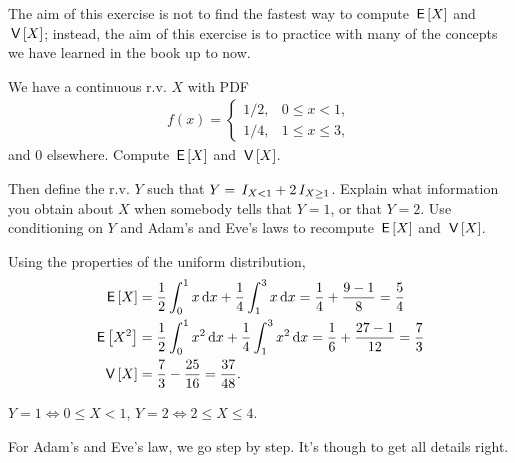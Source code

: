 \begin{exercise}
The aim of this exercise is not to find the fastest way to compute $\,\mathsf{E}\left[X\right]$ and $\,\mathsf{V}\left[X\right]$; instead, the aim of this exercise is to practice with many of the concepts we have learned in the book up to now.


We have a continuous r.v. $X$ with PDF
\begin{align}
  \label{eq:1123}
  f(x) =
  \begin{cases}
    1/2, & 0\leq x < 1, \\
    1/4, & 1\leq x \leq 3,
  \end{cases}
\end{align}
and $0$ elsewhere. Compute $\,\mathsf{E}\left[X\right]$ and $\,\mathsf{V}\left[X\right]$.

Then define the r.v.
$Y$ such that $Y=\,I_{X< 1} + 2\,I_{X\geq 1}$.
Explain what information you obtain about $X$ when somebody tells that $Y=1$, or that $Y=2$.
Use conditioning on $Y$ and Adam's and Eve's laws to recompute $\,\mathsf{E}\left[X\right]$ and $\,\mathsf{V}\left[X\right]$.


\begin{solution}
Using the properties of the uniform distribution,
\begin{align}
\,\mathsf{E}\left[X\right] &= \frac{1}{2} \int_0^1 x \,\textrm{d}x + \frac{1}{4} \int_1^3 x \,\textrm{d}x = \frac{1}{4} + \frac{9-1}{8} = \frac{5}{4} \\
\,\mathsf{E}\left[X^2\right] &=  \frac{1}{2}\int_0^{1} x^{2}\,\textrm{d}x + \frac{1}{4}\int_1^{3} x^{2}\,\textrm{d}x = \frac{1}{6} + \frac{27-1}{12} = \frac{7}{3} \\
\,\mathsf{V}\left[X\right] &=  \frac{7}{3} - \frac{25}{16} = \frac{37}{48}.
\end{align}

$Y=1 \iff 0\leq X< 1$,  $Y=2 \iff 2\leq X \leq 4$.

For Adam's and Eve's law, we go step by step. It's though to get all details right.


\end{solution}
\end{exercise}
